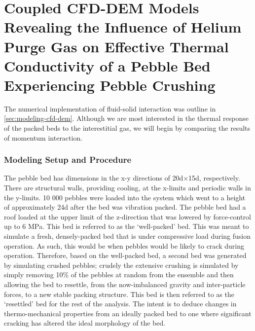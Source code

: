 \chapter{Coupled CFD-DEM Models Revealing the Influence of Helium Purge Gas on Effective Thermal Conductivity of a Pebble Bed Experiencing Pebble Crushing}\label{sec:cfd-dem-studies}
The numerical implementation of fluid-solid interaction was outline in \cref{sec:modeling-cfd-dem}. Although we are most interested in the thermal response of the packed beds to the interestitial gas, we will begin by comparing the results of momentum interaction.
\subsection{Modeling Setup and Procedure}
The pebble bed has dimensions in the x-y directions of 20d×15d, respectively. There are structural walls, providing cooling, at the x-limits and periodic walls in the y-limits. 10 000 pebbles were loaded into the system which went to a height of approximately 24d after the bed was vibration packed. The pebble bed had a roof loaded at the upper limit of the z-direction that was lowered by force-control up to 6 MPa. This bed is referred to as the ‘well-packed’ bed. This was meant to simulate a fresh, densely-packed bed that is under compressive load during fusion operation. As such, this would be when pebbles would be likely to crack during operation. Therefore, based on the well-packed bed, a second bed was generated by simulating crushed pebbles; crudely the extensive crushing is simulated by simply removing 10\% of the pebbles at random from the ensemble and then allowing the bed to resettle, from the now-imbalanced gravity and inter-particle forces, to a new stable packing structure. This bed is then referred to as the ‘resettled’ bed for the rest of the analysis. The intent is to deduce changes in thermo-mechanical properties from an ideally packed bed to one where significant cracking has altered the ideal morphology of the bed. 


